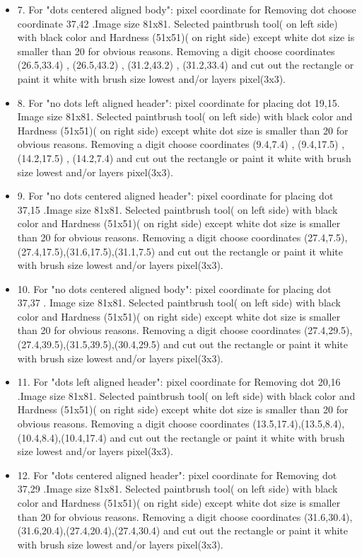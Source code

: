 \documentclass[a4paper]{article}
\begin{document}
\begin{itemize}
\item 7. For "dots centered aligned body": pixel coordinate for Removing dot choose coordinate 37,42 .Image size 81x81. Selected paintbrush tool( on left side) with black color and  Hardness (51x51)( on right side) except white dot size is smaller than 20 for obvious reasons. Removing a digit choose coordinates (26.5,33.4) , (26.5,43.2) , (31.2,43.2) , (31.2,33.4) and cut out the rectangle or paint it white with brush size lowest and/or layers pixel(3x3).
\item 8. For "no dots left aligned header": pixel coordinate for  placing dot 19,15. Image size 81x81. Selected paintbrush tool( on left side) with black color and  Hardness (51x51)( on right side)  except white dot  size is smaller than 20 for obvious reasons. Removing a digit choose coordinates (9.4,7.4) , (9.4,17.5) , (14.2,17.5) , (14.2,7.4) and cut out the rectangle or paint it white with brush size lowest and/or layers pixel(3x3).
\item 9. For "no dots centered aligned header": pixel coordinate for placing dot 37,15 .Image size 81x81. Selected paintbrush tool( on left side) with black color and  Hardness (51x51)( on right side) except white dot size is smaller than 20 for obvious reasons. Removing a digit choose coordinates (27.4,7.5),(27.4,17.5),(31.6,17.5),(31.1,7.5) and cut out the rectangle or paint it white with brush size lowest and/or layers pixel(3x3).
\item 10. For "no dots centered aligned body": pixel coordinate for placing dot 37,37 . Image size 81x81. Selected paintbrush tool( on left side) with black color and  Hardness (51x51)( on right side)  except white dot size is smaller than 20 for obvious reasons. Removing a digit choose coordinates (27.4,29.5),(27.4,39.5),(31.5,39.5),(30.4,29.5) and cut out the rectangle or paint it white with brush size 	lowest and/or layers pixel(3x3).
\item 11. For "dots left aligned header": pixel coordinate for Removing dot 20,16 .Image size 81x81. Selected paintbrush tool( on left side) with black color and  Hardness (51x51)( on right side)  except white dot size is smaller than 20 for obvious reasons. Removing a digit choose coordinates (13.5,17.4),(13.5,8.4),(10.4,8.4),(10.4,17.4) and cut out the rectangle or paint it white with brush size lowest and/or layers pixel(3x3).
\item 12. For "dots centered aligned header": pixel coordinate for Removing dot 37,29 .Image size 81x81. Selected paintbrush tool( on left side) with black color and  Hardness (51x51)( on right side) except white dot size is smaller than 20 for obvious reasons. Removing a digit choose coordinates (31.6,30.4),(31.6,20.4),(27.4,20.4),(27.4,30.4) and cut out the rectangle or paint it white with brush size 	lowest and/or layers pixel(3x3).

\end{itemize}
\end{document}
